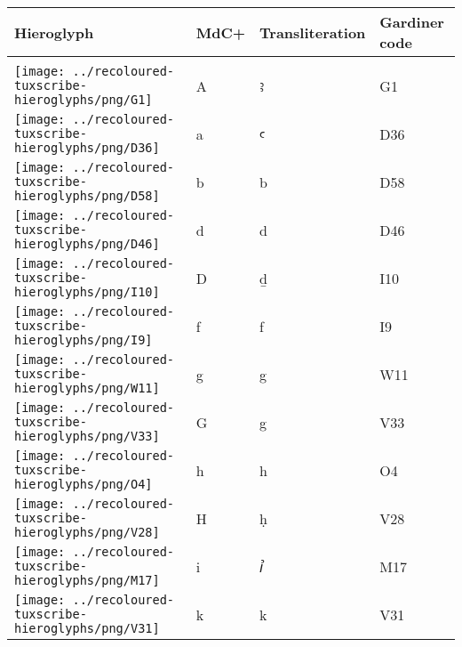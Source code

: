 \begin{center}
\begin{tabularx}{\linewidth}{YYYY}
Hieroglyph & MdC+ & Transliteration & Gardiner code\\
\hline\\
\texttt{[image: ../recoloured-tuxscribe-hieroglyphs/png/G1]} & A & ꜣ & G1 \\ 
\vspace{0.30000cm} \texttt{[image: ../recoloured-tuxscribe-hieroglyphs/png/D36]} \vspace{0.30000cm} & a & ꜥ & D36 \\ 
\texttt{[image: ../recoloured-tuxscribe-hieroglyphs/png/D58]} & b & b & D58 \\ 
\vspace{0.12500cm} \texttt{[image: ../recoloured-tuxscribe-hieroglyphs/png/D46]} \vspace{0.12500cm} & d & d & D46 \\ 
\texttt{[image: ../recoloured-tuxscribe-hieroglyphs/png/I10]} & D & ḏ & I10 \\ 
\vspace{0.17500cm} \texttt{[image: ../recoloured-tuxscribe-hieroglyphs/png/I9]} \vspace{0.17500cm} & f & f & I9 \\ 
\texttt{[image: ../recoloured-tuxscribe-hieroglyphs/png/W11]} & g & g & W11 \\ 
\texttt{[image: ../recoloured-tuxscribe-hieroglyphs/png/V33]} & G & g & V33 \\ 
\texttt{[image: ../recoloured-tuxscribe-hieroglyphs/png/O4]} & h & h & O4 \\ 
\texttt{[image: ../recoloured-tuxscribe-hieroglyphs/png/V28]} & H & ḥ & V28 \\ 
\texttt{[image: ../recoloured-tuxscribe-hieroglyphs/png/M17]} & i & ꞽ & M17 \\ 
\vspace{0.30000cm} \texttt{[image: ../recoloured-tuxscribe-hieroglyphs/png/V31]} \vspace{0.30000cm} & k & k & V31 \\ 
\end{tabularx}
\end{center}


